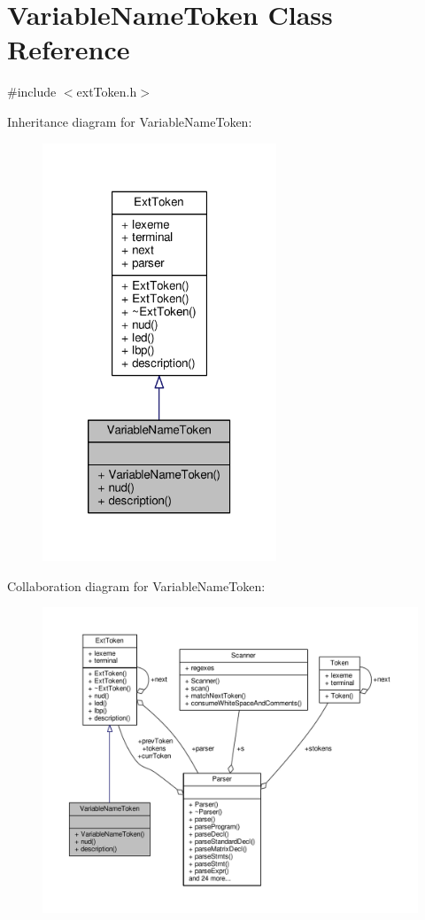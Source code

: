 \hypertarget{classVariableNameToken}{\section{Variable\-Name\-Token Class Reference}
\label{classVariableNameToken}
}


{\ttfamily \#include $<$ext\-Token.\-h$>$}



Inheritance diagram for Variable\-Name\-Token\-:\nopagebreak
\begin{figure}[H]
\begin{center}
\leavevmode
\includegraphics[width=198pt]{classVariableNameToken__inherit__graph}
\end{center}
\end{figure}


Collaboration diagram for Variable\-Name\-Token\-:\nopagebreak
\begin{figure}[H]
\begin{center}
\leavevmode
\includegraphics[width=350pt]{classVariableNameToken__coll__graph}
\end{center}
\end{figure}
